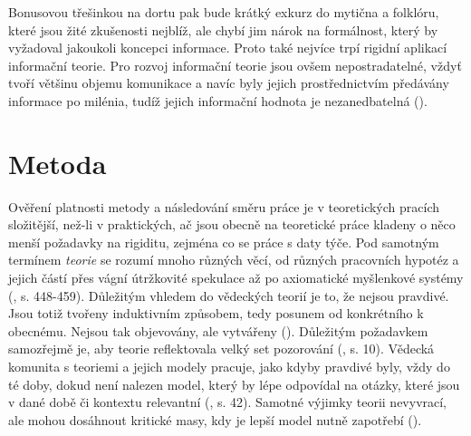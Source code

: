 \documentclass[11pt,a4paper]{article}
\begin{document}
Bonusovou třešinkou na dortu pak bude krátký exkurz do mytična a folklóru, které jsou žité zkušenosti nejblíž, ale chybí jim nárok na formálnost, který by vyžadoval jakoukoli koncepci informace. Proto také nejvíce trpí rigidní aplikací informační teorie. Pro rozvoj informační teorie jsou ovšem nepostradatelné, vždyť tvoří většinu objemu komunikace a navíc byly jejich prostřednictvím předávány informace po milénia, tudíž jejich informační hodnota je nezanedbatelná (\cite{mcdowell_storytelling_2021}).





\pagebreak


\section*{Metoda}

Ověření platnosti metody a následování směru práce je v teoretických pracích složitější, než-li v praktických, ač jsou obecně na teoretické práce kladeny o něco menší požadavky na rigiditu, zejména co se práce s daty týče. Pod samotným termínem \textit{teorie} se rozumí mnoho různých věcí, od různých pracovních hypotéz a jejich částí přes vágní útržkovité spekulace až po axiomatické myšlenkové systémy (\cite{calhoun_sociological_2007}, s. 448-459). Důležitým vhledem do vědeckých teorií je to, že nejsou pravdivé. Jsou totiž tvořeny induktivním způsobem, tedy posunem od konkrétního k obecnému. Nejsou tak objevovány, ale vytvářeny (\cite{mintzberg_developing_2014}). Důležitým požadavkem samozřejmě je, aby teorie reflektovala velký set pozorování (\cite{hawking_brief_1998}, s. 10). Vědecká komunita s teoriemi a jejich modely pracuje, jako kdyby pravdivé byly, vždy do té doby, dokud není nalezen model, který by lépe odpovídal na otázky, které jsou v dané době či kontextu relevantní (\cite{barbara_m_wildemuth_questions_2017}, s. 42). Samotné výjimky teorii nevyvrací, ale mohou dosáhnout kritické masy, kdy je lepší model nutně zapotřebí (\cite{kuhn_structure_2012}).  
\end{document}
